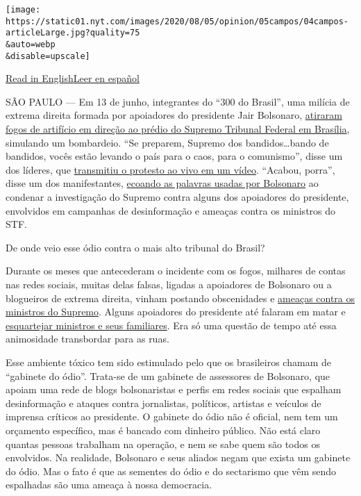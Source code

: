 \texttt{[image: https://static01.nyt.com/images/2020/08/05/opinion/05campos/04campos-articleLarge.jpg?quality=75\\\&auto=webp\\\&disable=upscale]}

\href{https://www.nytimes.com/2020/08/04/opinion/bolsonaro-office-of-hate-brazil.html}{Read
in
English}\href{https://www.nytimes.com/es/2020/08/04/espanol/opinion/bolsonaro-oficina-odio-brasil.html}{Leer
en español}

SÃO PAULO --- Em 13 de junho, integrantes do ``300 do Brasil'', uma
milícia de extrema direita formada por apoiadores do presidente Jair
Bolsonaro,
\href{https://www1.folha.uol.com.br/poder/2020/05/sara-winter-xinga-moraes-diz-querer-trocar-socos-com-ele-e-promete-inferniza-lo.shtml}{atiraram
fogos de artifício em direção ao prédio do Supremo Tribunal Federal em
Brasília}, simulando um bombardeio. ``Se preparem, Supremo dos
bandidos\ldots bando de bandidos, vocês estão levando o país para o
caos, para o comunismo'', disse um dos líderes, que
\href{https://www.metropoles.com/brasil/video-bolsonaristas-lancam-fogos-de-artificio-em-predio-do-stf}{transmitiu
o protesto ao vivo em um vídeo}. ``Acabou, porra'', disse um dos
manifestantes,
\href{https://www.youtube.com/watch?v=I2bZoC8FHJI}{ecoando as palavras
usadas por Bolsonaro} ao condenar a investigação do Supremo contra
alguns dos apoiadores do presidente, envolvidos em campanhas de
desinformação e ameaças contra os ministros do STF.

De onde veio esse ódio contra o mais alto tribunal do Brasil?

Durante os meses que antecederam o incidente com os fogos, milhares de
contas nas redes sociais, muitas delas falsas, ligadas a apoiadores de
Bolsonaro ou a blogueiros de extrema direita, vinham postando
obscenidades e
\href{https://www1.folha.uol.com.br/poder/2020/05/sara-winter-xinga-moraes-diz-querer-trocar-socos-com-ele-e-promete-inferniza-lo.shtml}{ameaças
contra os ministros do Supremo}. Alguns apoiadores do presidente até
falaram em matar e
\href{https://g1.globo.com/politica/noticia/2020/06/17/moraes-vota-pela-legalidade-e-continuidade-do-inquerito-das-fake-news.ghtml}{esquartejar
ministros e seus familiares}. Era só uma questão de tempo até essa
animosidade transbordar para as ruas.

Esse ambiente tóxico tem sido estimulado pelo que os brasileiros chamam
de ``gabinete do ódio''. Trata-se de um gabinete de assessores de
Bolsonaro, que apoiam uma rede de blogs bolsonaristas e perfis em redes
sociais que espalham desinformação e ataques contra jornalistas,
políticos, artistas e veículos de imprensa críticos ao presidente. O
gabinete do ódio não é oficial, nem tem um orçamento específico, mas é
bancado com dinheiro público. Não está claro quantas pessoas trabalham
na operação, e nem se sabe quem são todos os envolvidos. Na realidade,
Bolsonaro e seus aliados negam que exista um gabinete do ódio. Mas o
fato é que as sementes do ódio e do sectarismo que vêm sendo espalhadas
são uma ameaça à nossa democracia.

